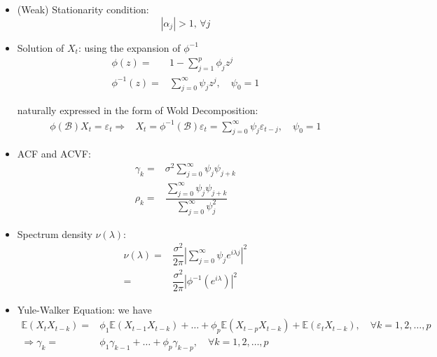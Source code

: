     \begin{itemize}[topsep=2pt,itemsep=0pt]
        \item (Weak) Stationarity condition: 
        \begin{equation}
            |\alpha _j| > 1,\,\forall j
        \end{equation}
        
        \item Solution of $ X_t $: using the expansion of $ \phi ^{-1} $
        \begin{align*}
            \phi (z)=&1-\sum_{j=1}^p\phi _jz^j\\
            \phi ^{-1}(z)=&\sum_{j=0}^\infty \psi _{j}z^j,\quad \psi _0=1
        \end{align*}

        naturally expressed in the form of Wold Decomposition:
        \begin{align*}
            \phi (\mathscr{B} )X_t=\varepsilon _t\Rightarrow & X_t=\phi ^{-1}(\mathscr{B} )\varepsilon _t=\sum_{j=0}^\infty \psi _j\varepsilon _{t-j},\quad \psi _0=1
        \end{align*}

        \item ACF and ACVF:
        \begin{align*}
            \gamma _k=&\sigma ^2\sum_{j=0}^\infty \psi _j\psi _{j+k}\\
            \rho _k=&\dfrac{\sum_{j=0}^\infty\psi _j\psi _{j+k}}{\sum_{j=0}^\infty\psi _j^2}
        \end{align*}
        \item Spectrum density $ \nu (\lambda ) $:
        \begin{align*}
            \nu  (\lambda )=&\dfrac{\sigma ^2}{2\pi}\left\vert \sum_{j=0}^\infty \psi _je^{i\lambda j} \right\vert^2\\
            =& \dfrac{\sigma ^2}{2\pi}\left\vert\phi ^{-1}(e^{i\lambda })\right\vert^2
        \end{align*}
        \item Yule-Walker Equation: we have
        \begin{align*}
            \mathbb{E}\left( X_tX_{t-k} \right) =&\phi _1\mathbb{E}\left( X_{t-1}X_{t-k} \right) +\ldots+\phi _p\mathbb{E}\left( X_{t-p}X_{t-k} \right) +\mathbb{E}\left( \varepsilon _tX_{t-k} \right)  ,\quad \forall k=1,2,\ldots,p\\
            \Rightarrow \gamma _k=&\phi _1\gamma_{k-1}+\ldots+\phi _p\gamma _{k-p}, \quad \forall k=1,2,\ldots,p
        \end{align*}


\end{itemize}
